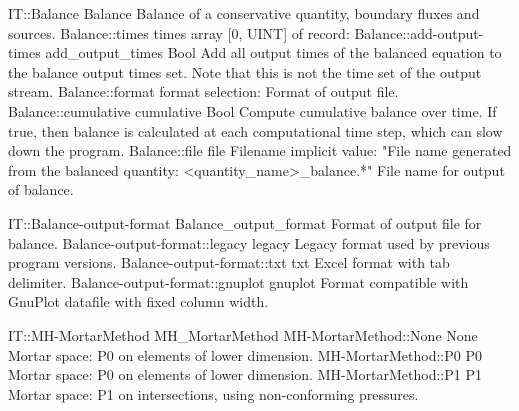 \begin{RecordType}
	{IT::Balance}
	{Balance}
	{}%
	{}%
	{{{Balance of a conservative quantity, boundary fluxes and sources.}%
}}
		\RecKey
			{Balance::times}
			{times}
			{{array [0, UINT] of }{record: }}{}
			{ \ValueDefault{[]}}
			{}
		\RecKey
			{Balance::add-output-times}
			{add{\_}output{\_}times}
			{{Bool}}{}
			{ }
			{{{Add all output times of the balanced equation to the balance output times set.
Note that this is not the time set of the output stream.}%
}}
		\RecKey
			{Balance::format}
			{format}
			{{selection: }}{}
			{ }
			{{{Format of output file.}%
}}
		\RecKey
			{Balance::cumulative}
			{cumulative}
			{{Bool}}{}
			{ }
			{{{Compute cumulative balance over time.
If true, then balance is calculated at each computational time step, which can slow down the program.}%
}}
		\RecKey
			{Balance::file}
			{file}
			{{Filename}}{}
			{implicit value: "{File name generated from the balanced quantity: {\textless}quantity{\_}name{\textgreater}{\_}balance.*}"}
			{{{File name for output of balance.}%
}}
\end{RecordType}
\begin{SelectionType}
	{IT::Balance-output-format}
	{Balance{\_}output{\_}format}
	{{{Format of output file for balance.}%
}}
		\SelectionItem
			{Balance-output-format::legacy}
			{legacy}
			{{{Legacy format used by previous program versions.}%
}}
		\SelectionItem
			{Balance-output-format::txt}
			{txt}
			{{{Excel format with tab delimiter.}%
}}
		\SelectionItem
			{Balance-output-format::gnuplot}
			{gnuplot}
			{{{Format compatible with GnuPlot datafile with fixed column width.}%
}}
\end{SelectionType}
\begin{SelectionType}
	{IT::MH-MortarMethod}
	{MH{\_}MortarMethod}
	{}
		\SelectionItem
			{MH-MortarMethod::None}
			{None}
			{{{Mortar space: P0 on elements of lower dimension.}%
}}
		\SelectionItem
			{MH-MortarMethod::P0}
			{P0}
			{{{Mortar space: P0 on elements of lower dimension.}%
}}
		\SelectionItem
			{MH-MortarMethod::P1}
			{P1}
			{{{Mortar space: P1 on intersections, using non-conforming pressures.}%
}}
\end{SelectionType}
